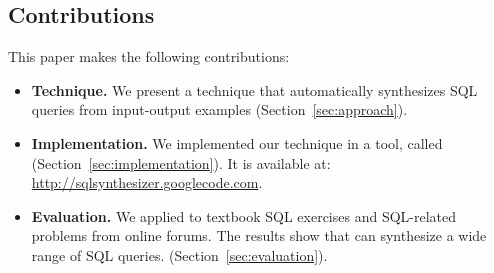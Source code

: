 \subsection{Contributions}

This paper makes the following contributions:

\begin{itemize}

\item \textbf{Technique.} We present a technique that automatically
synthesizes SQL queries from input-output examples
(Section~\ref{sec:approach}).

\item \textbf{Implementation.} We implemented our technique in a
tool, called \ourtool (Section~\ref{sec:implementation}). It is
available at: \url{http://sqlsynthesizer.googlecode.com}.

\item \textbf{Evaluation.} We applied \ourtool
to \exnum textbook SQL exercises and \pnum 
SQL-related problems from online forums.
The results show that \ourtool can synthesize
a wide range of SQL queries.
(Section~\ref{sec:evaluation}).
\end{itemize}
